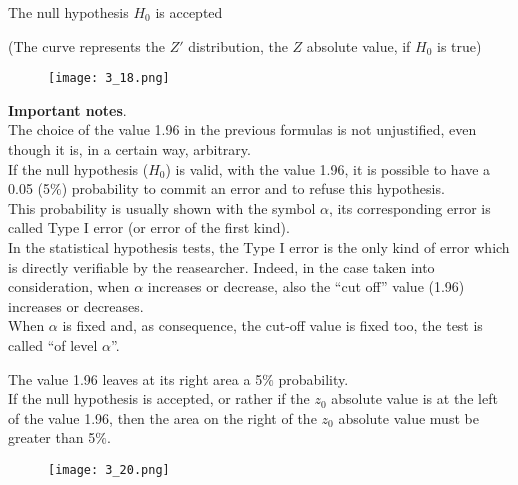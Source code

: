 \begin{frame}
  \vspace*{.25cm}
  \centering
  The null hypothesis  $ H_0 $ is accepted\\
  \begin{tiny} (The curve represents the $ Z' $ distribution, the $ Z $ absolute value, if $ H_0 $ is true) \end{tiny}
  \begin{figure}
    \texttt{[image: 3\_18.png]}
  \end{figure}
\end{frame}

\begin{frame}
  \begin{small}
    \vspace*{.25cm}
    \textbf{Important notes}.\\
    \vspace*{.25cm}
    The choice of the value 1.96 in the previous formulas is not unjustified, even though it is, in a certain way, arbitrary.\\
    \vspace*{.1cm}
    If the null hypothesis ($ H_0 $) is valid, with the value 1.96, it is possible to have a 0.05 (5$ \% $) probability to commit an error and to refuse this hypothesis.\\
    \vspace*{.2cm}
    This probability is usually shown with the symbol $\alpha$, its corresponding error is called Type I error (or error of the first kind).\\
    \vspace*{.2cm}
    In the statistical hypothesis tests, the Type I error is the only kind of error which is directly verifiable by the reasearcher. Indeed, in the case taken into consideration, when $ \alpha $ increases or decrease, also the ``cut off'' value (1.96) increases or decreases.\\
   \vspace*{.2cm}
   When $ \alpha $ is fixed and, as consequence, the cut-off value is fixed too, the test is called ``of level $\alpha$''.
  \end{small}
\end{frame}

\begin{frame}
  The value 1.96 leaves at its right area a 5$ \% $ probability.\\
  \vspace*{.25cm}
  If the null hypothesis is accepted, or rather if the $ z_0 $ absolute value is at the left of the value 1.96, then the area on the right of the $ z_0 $ absolute value must be greater than 5$ \% $.\\
  \begin{figure}
    \texttt{[image: 3\_20.png]}
  \end{figure}
\end{frame}

